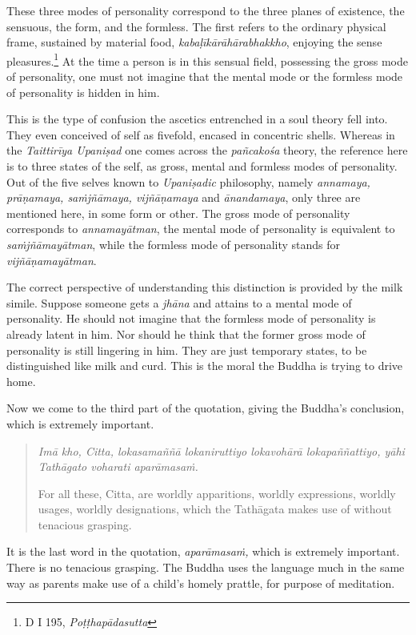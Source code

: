 These three modes of personality correspond to the three planes of existence, the sensuous, the form, and the formless. The first refers to the ordinary physical frame, sustained by material food, \emph{kabaḷīkārāhārabhakkho}, enjoying the sense pleasures.\footnote{D I 195, \emph{Poṭṭhapādasutta}} At the time a person is in this sensual field, possessing the gross mode of personality, one must not imagine that the mental mode or the formless mode of personality is hidden in him.

This is the type of confusion the ascetics entrenched in a soul theory fell into. They even conceived of self as fivefold, encased in concentric shells. Whereas in the \emph{Taittirīya Upaniṣad} one comes across the \emph{pañcakośa} theory, the reference here is to three states of the self, as gross, mental and formless modes of personality. Out of the five selves known to \emph{Upaniṣadic} philosophy, namely \emph{annamaya, prāṇamaya, saṁjñāmaya, vijñāṇamaya} and \emph{ānandamaya}, only three are mentioned here, in some form or other. The gross mode of personality corresponds to \emph{annamayātman}, the mental mode of personality is equivalent to \emph{saṁjñāmayātman}, while the formless mode of personality stands for \emph{vijñāṇamayātman}.

The correct perspective of understanding this distinction is provided by the milk simile. Suppose someone gets a \emph{jhāna} and attains to a mental mode of personality. He should not imagine that the formless mode of personality is already latent in him. Nor should he think that the former gross mode of personality is still lingering in him. They are just temporary states, to be distinguished like milk and curd. This is the moral the Buddha is trying to drive home.

Now we come to the third part of the quotation, giving the Buddha's conclusion, which is extremely important.

\begin{quote}
\emph{Imā kho, Citta, lokasamaññā lokaniruttiyo lokavohārā lokapaññattiyo, yāhi Tathāgato voharati aparāmasaṁ.}

For all these, Citta, are worldly apparitions, worldly expressions, worldly usages, worldly designations, which the Tathāgata makes use of without tenacious grasping.
\end{quote}

It is the last word in the quotation, \emph{aparāmasaṁ,} which is extremely important. There is no tenacious grasping. The Buddha uses the language much in the same way as parents make use of a child's homely prattle, for purpose of meditation.

